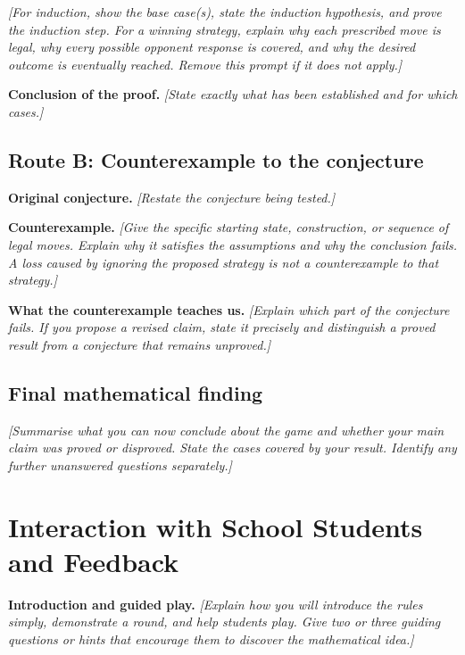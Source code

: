 \documentclass[11pt,a4paper]{article}
\newif\ifshowguidance
\newcommand{\placeholder}[1]{\textit{[#1]}}
\newcommand{\guidance}[1]{%
  \ifshowguidance
    \par\smallskip\noindent
    \begingroup\setlength{\fboxsep}{8pt}%
    \colorbox{guidebg}{\parbox{\dimexpr\linewidth-2\fboxsep\relax}{%
      \small\color{guidetext}#1}}\endgroup\par\smallskip
  \fi}
\begin{document}
\placeholder{For induction, show the base case(s), state the induction
hypothesis, and prove the induction step. For a winning strategy, explain why
each prescribed move is legal, why every possible opponent response is
covered, and why the desired outcome is eventually reached. Remove this
prompt if it does not apply.}

\textbf{Conclusion of the proof.}
\placeholder{State exactly what has been established and for which cases.}

\subsection*{Route B: Counterexample to the conjecture}
\textbf{Original conjecture.}
\placeholder{Restate the conjecture being tested.}

\textbf{Counterexample.}
\placeholder{Give the specific starting state, construction, or sequence of
legal moves. Explain why it satisfies the assumptions and why the conclusion
fails. A loss caused by ignoring the proposed strategy is not a counterexample
to that strategy.}

\textbf{What the counterexample teaches us.}
\placeholder{Explain which part of the conjecture fails. If you propose a
revised claim, state it precisely and distinguish a proved result from a
conjecture that remains unproved.}

\subsection*{Final mathematical finding}
\placeholder{Summarise what you can now conclude about the game and whether
your main claim was proved or disproved. State the cases covered by your
result. Identify any further unanswered questions separately.}

\newpage
\section{Interaction with School Students and Feedback}
\guidance{The participants may be up to 15 years old. If the activity has not
yet taken place, label this section \textbf{Planned interaction}; describe the
plan and leave actual observations for later. Do not present planned outcomes
as observed results.}

\textbf{Introduction and guided play.}
\placeholder{Explain how you will introduce the rules simply, demonstrate a
round, and help students play. Give two or three guiding questions or hints
that encourage them to discover the mathematical idea.}
\end{document}
